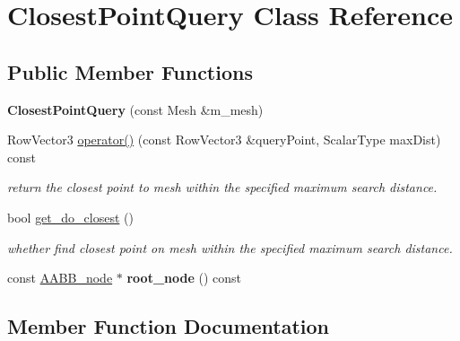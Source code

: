 \hypertarget{class_closest_point_query}{}\section{Closest\+Point\+Query Class Reference}
\label{class_closest_point_query}
\subsection*{Public Member Functions}
\begin{DoxyCompactItemize}
\item 
{\bfseries Closest\+Point\+Query} (const Mesh \&m\+\_\+mesh)\hypertarget{class_closest_point_query_a8c6234ce0c90f5367d6cbd3610e5f56e}{}\label{class_closest_point_query_a8c6234ce0c90f5367d6cbd3610e5f56e}

\item 
Row\+Vector3 \hyperlink{class_closest_point_query_a696ae543c80453994cd68d69d807a8e4}{operator()} (const Row\+Vector3 \&query\+Point, Scalar\+Type max\+Dist) const 
\begin{DoxyCompactList}\small\item\em return the closest point to mesh within the specified maximum search distance. \end{DoxyCompactList}\item 
bool \hyperlink{class_closest_point_query_a3d1ae705eab94b8f3d6502243d5d9494}{get\+\_\+do\+\_\+closest} ()\hypertarget{class_closest_point_query_a3d1ae705eab94b8f3d6502243d5d9494}{}\label{class_closest_point_query_a3d1ae705eab94b8f3d6502243d5d9494}

\begin{DoxyCompactList}\small\item\em whether find closest point on mesh within the specified maximum search distance. \end{DoxyCompactList}\item 
const \hyperlink{class_a_a_b_b__node}{A\+A\+B\+B\+\_\+node} $\ast$ {\bfseries root\+\_\+node} () const \hypertarget{class_closest_point_query_a6aaaaf5d40b70ee8647eecab5dda120c}{}\label{class_closest_point_query_a6aaaaf5d40b70ee8647eecab5dda120c}

\end{DoxyCompactItemize}


\subsection{Member Function Documentation}
